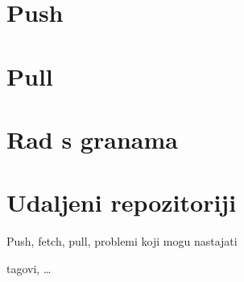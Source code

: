 \section*{Push}

\section*{Pull}

\section*{Rad s granama}

\section*{Udaljeni repozitoriji}

Push, fetch, pull, problemi koji mogu nastajati

tagovi, \dots


